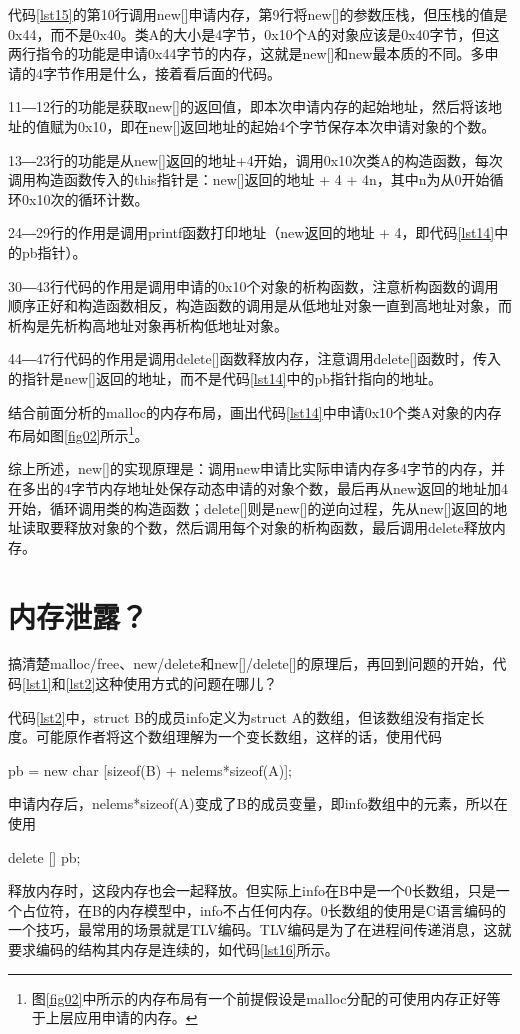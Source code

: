 \documentclass[a4paper, 12pt, titlepage]{article}
\begin{document}
代码\ref{lst15}的第10行调用new[]申请内存，第9行将new[]的参数压栈，{\color{red}但压栈的值是0x44，而不是0x40}。类A的大小是4字节，0x10个A的对象应该是0x40字节，但这两行指令的功能是申请0x44字节的内存，这就是new[]和new最本质的不同。多申请的4字节作用是什么，接着看后面的代码。

11―12行的功能是获取new[]的返回值，即本次申请内存的起始地址，然后将该地址的值赋为0x10，即在new[]返回地址的起始4个字节保存本次申请对象的个数。

13―23行的功能是从new[]返回的地址+4开始，调用0x10次类A的构造函数，每次调用构造函数传入的this指针是：new[]返回的地址 + 4 + 4n，其中n为从0开始循环0x10次的循环计数。

24―29行的作用是调用printf函数打印地址（new返回的地址 + 4，即代码\ref{lst14}中的pb指针）。

30―43行代码的作用是调用申请的0x10个对象的析构函数，注意析构函数的调用顺序正好和构造函数相反，构造函数的调用是从低地址对象一直到高地址对象，而析构是先析构高地址对象再析构低地址对象。

44―47行代码的作用是调用delete[]函数释放内存，注意调用delete[]函数时，传入的指针是new[]返回的地址，而不是代码\ref{lst14}中的pb指针指向的地址。

结合前面分析的malloc的内存布局，画出代码\ref{lst14}中申请0x10个类A对象的内存布局如图\ref{fig02}所示\footnote{图\ref{fig02}中所示的内存布局有一个前提假设是malloc分配的可使用内存正好等于上层应用申请的内存。}。


综上所述，new[]的实现原理是：调用new申请比实际申请内存多4字节的内存，并在多出的4字节内存地址处保存动态申请的对象个数，最后再从new返回的地址加4开始，循环调用类的构造函数；delete[]则是new[]的逆向过程，先从new[]返回的地址读取要释放对象的个数，然后调用每个对象的析构函数，最后调用delete释放内存。

\section{内存泄露？}
搞清楚malloc/free、new/delete和new[]/delete[]的原理后，再回到问题的开始，代码\ref{lst1}和\ref{lst2}这种使用方式的问题在哪儿？

代码\ref{lst2}中，struct B的成员info定义为struct A的数组，但该数组没有指定长度。可能原作者将这个数组理解为一个变长数组，这样的话，使用代码
\begin{center}
pb = new char [sizeof(B) + nelems*sizeof(A)];
\end{center}
申请内存后，nelems*sizeof(A)变成了B的成员变量，即info数组中的元素，所以在使用
\begin{center}
delete [] pb;
\end{center}
释放内存时，这段内存也会一起释放。但实际上info在B中是一个0长数组，只是一个占位符，在B的内存模型中，info不占任何内存。0长数组的使用是C语言编码的一个技巧，最常用的场景就是TLV编码。TLV编码是为了在进程间传递消息，这就要求编码的结构其内存是连续的，如代码\ref{lst16}所示。
\begin{spacing}{1.0}
  
\end{spacing}
\end{document}
